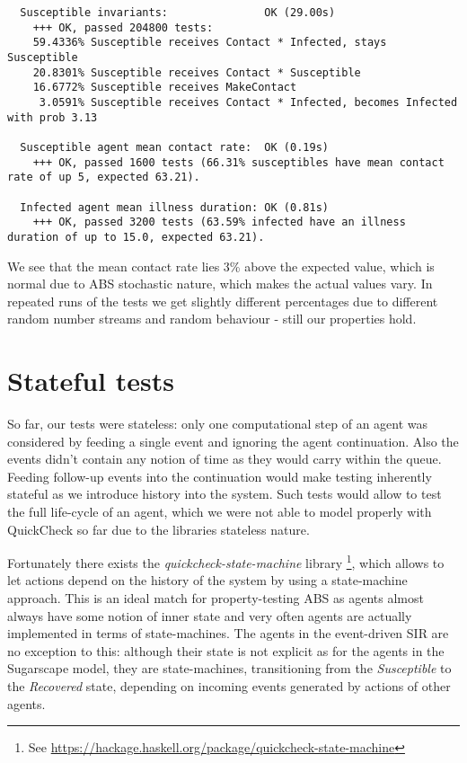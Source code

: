 \begin{verbatim}
  Susceptible invariants:               OK (29.00s)
    +++ OK, passed 204800 tests:
    59.4336% Susceptible receives Contact * Infected, stays Susceptible
    20.8301% Susceptible receives Contact * Susceptible
    16.6772% Susceptible receives MakeContact
     3.0591% Susceptible receives Contact * Infected, becomes Infected with prob 3.13
     
  Susceptible agent mean contact rate:  OK (0.19s)
    +++ OK, passed 1600 tests (66.31% susceptibles have mean contact rate of up 5, expected 63.21).
    
  Infected agent mean illness duration: OK (0.81s)
    +++ OK, passed 3200 tests (63.59% infected have an illness duration of up to 15.0, expected 63.21).
\end{verbatim}

We see that the mean contact rate lies 3\% above the expected value, which is normal due to ABS stochastic nature, which makes the actual values vary. In repeated runs of the tests we get slightly different percentages due to different random number streams and random behaviour - still our properties hold.

\section{Stateful tests}
So far, our tests were stateless: only one computational step of an agent was considered by feeding a single event and ignoring the agent continuation. Also the events didn't contain any notion of time as they would carry within the queue. Feeding follow-up events into the continuation would make testing inherently stateful as we introduce history into the system. Such tests would allow to test the full life-cycle of an agent, which we were not able to model properly with QuickCheck so far due to the libraries stateless nature.

Fortunately there exists the \textit{quickcheck-state-machine} library \footnote{See \url{https://hackage.haskell.org/package/quickcheck-state-machine}}, which allows to let actions depend on the history of the system by using a state-machine approach. This is an ideal match for property-testing ABS as agents almost always have some notion of inner state and very often agents are actually implemented in terms of state-machines. The agents in the event-driven SIR are no exception to this: although their state is not explicit as for the agents in the Sugarscape model, they are state-machines, transitioning from the \textit{Susceptible} to the \textit{Recovered} state, depending on incoming events generated by actions of other agents.

